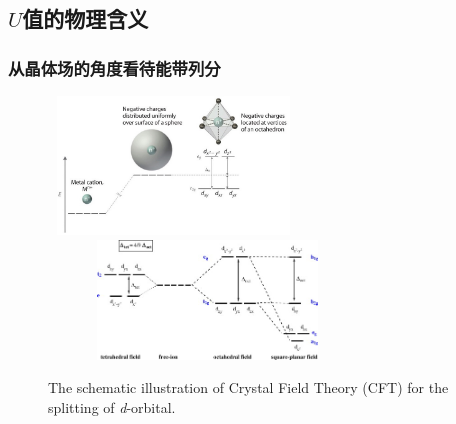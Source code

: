 \subsection{$U$值的物理含义}
\frame
{
	\frametitle{从晶体场的角度看待能带列分}
\begin{figure}[h!]
\centering
\vspace*{-0.22in}
\includegraphics[height=1.45in,width=2.62in,viewport=0 0 585 350,clip]{Figures/Crystal-Field-Theory.jpg}
\includegraphics[height=1.25in,width=3.32in,viewport=0 0 315 170,clip]{Figures/Crystal-Field-Theory_energy.jpg}
\caption{\tiny \textrm{The schematic illustration of Crystal Field Theory (CFT) for the splitting of \textit{d}-orbital.}}%
\label{CFT_d-splitting}
\end{figure}
}
 
